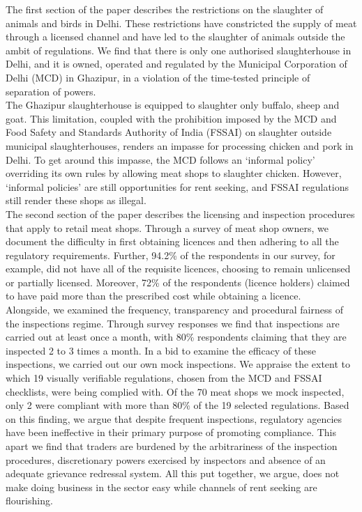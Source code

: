\documentclass[a4paper, 12pt]{article}
\begin{document}
The first section of the paper describes the restrictions on the slaughter of animals and birds in Delhi. These restrictions have constricted the supply of meat through a licensed channel and have led to the slaughter of animals outside the ambit of regulations. We find that there is only one authorised slaughterhouse in Delhi, and it is owned, operated and regulated by the Municipal Corporation of Delhi (MCD) in Ghazipur, in a violation of the time-tested principle of separation of powers. \\

The Ghazipur slaughterhouse is equipped to slaughter only buffalo, sheep and goat. This limitation, coupled with the prohibition imposed by the MCD and Food Safety and Standards Authority of India (FSSAI) on slaughter outside municipal slaughterhouses, renders an impasse for processing chicken and pork in Delhi. To get around this impasse, the MCD follows an ‘informal policy’ overriding its own rules by allowing meat shops to slaughter chicken. However, ‘informal policies’ are still opportunities for rent seeking, and FSSAI regulations still render these shops as illegal. \\

The second section of the paper describes the licensing and inspection procedures that apply to retail meat shops. Through a survey of meat shop owners, we document the difficulty in first obtaining licences and then adhering to all the regulatory requirements. Further, 94.2\% of the respondents in our survey, for example, did not have all of the requisite licences, choosing to remain unlicensed or partially licensed. Moreover, 72\% of the respondents (licence holders) claimed to have paid more than the prescribed cost while obtaining a licence. \\

Alongside, we examined the frequency, transparency and procedural fairness of the inspections regime. Through survey responses we find that inspections are carried out at least once a month, with 80\% respondents claiming that they are inspected 2 to 3 times a month. In a bid to examine the efficacy of these inspections, we carried out our own mock inspections. We appraise the extent to which 19 visually verifiable regulations, chosen from the MCD and FSSAI checklists, were being complied with. Of the 70 meat shops we mock inspected, only 2 were compliant with more than 80\% of the 19 selected regulations. Based on this finding, we argue that despite frequent inspections, regulatory agencies have been ineffective in their primary purpose of promoting compliance. This apart we find that traders are burdened by the arbitrariness of the inspection procedures, discretionary powers exercised by inspectors and absence of an adequate grievance redressal system. All this put together, we argue, does not make doing business in the sector easy while channels of rent seeking are flourishing. \\
\end{document}

